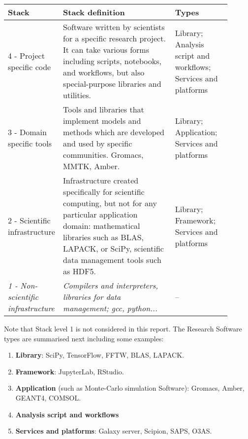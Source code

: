 \begin{center}
    \label{tab:rs_stacks}
    \small
    \begin{tabular}[t]{|p{0.15\linewidth}|p{0.5\linewidth}|p{0.25\linewidth}|} \hline

    \textbf{Stack} & \textbf{Stack definition} & \textbf{Types} \\ \hline \hline
      4 - Project specific code &
    Software written by scientists for a specific research project. It can take various forms including scripts, notebooks, and workflows, but also special-purpose libraries and utilities. &
    Library; Analysis script and workflows; Services and platforms \\ \hline

    3 - Domain specific tools &
    Tools and libraries that implement models and methods which are developed and used by specific communities. Gromacs, MMTK, Amber. &
    Library; Application; Services and platforms \\ \hline

    2 - Scientific infrastructure &
    Infrastructure created specifically for scientific computing, but not for any particular application domain: mathematical libraries such as BLAS, LAPACK, or SciPy, scientific data management tools such as HDF5. &
    Library; Framework; Services and platforms\\ \hline

    \it{1 - Non-scientific infrastructure} &
    \it{Compilers and interpreters, libraries for data management; gcc, python...} &
    -- \\ \hline

    \end{tabular}
\end{center}

Note that Stack level 1 is not considered in this report. The Research Software types are summarised next including some examples:

\begin{enumerate}
    \item \textbf{Library}: SciPy, TensorFlow, FFTW, BLAS, LAPACK.
    \item \textbf{Framework}: JupyterLab, RStudio.
    \item \textbf{Application} (such as Monte-Carlo simulation Software): Gromacs, Amber, GEANT4, COMSOL.
    \item \textbf{Analysis script and workflows}
    \item \textbf{Services and platforms}: Galaxy server, Scipion, SAPS, O3AS.
\end{enumerate}


